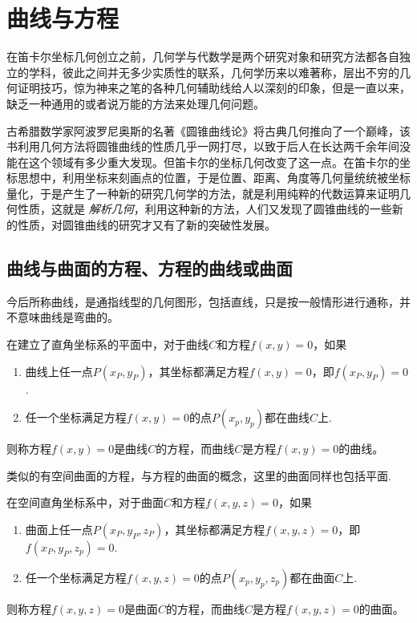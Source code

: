 
\section{曲线与方程}
\label{sec:curve-and-equation}

在笛卡尔坐标几何创立之前，几何学与代数学是两个研究对象和研究方法都各自独立的学科，彼此之间并无多少实质性的联系，几何学历来以难著称，层出不穷的几何证明技巧，惊为神来之笔的各种几何辅助线给人以深刻的印象，但是一直以来，缺乏一种通用的或者说万能的方法来处理几何问题。

古希腊数学家阿波罗尼奥斯的名著《圆锥曲线论》将古典几何推向了一个巅峰，该书利用几何方法将圆锥曲线的性质几乎一网打尽，以致于后人在长达两千余年间没能在这个领域有多少重大发现。但笛卡尔的坐标几何改变了这一点。在笛卡尔的坐标思想中，利用坐标来刻画点的位置，于是位置、距离、角度等几何量统统被坐标量化，于是产生了一种新的研究几何学的方法，就是利用纯粹的代数运算来证明几何性质，这就是 \emph{解析几何}，利用这种新的方法，人们又发现了圆锥曲线的一些新的性质，对圆锥曲线的研究才又有了新的突破性发展。

\subsection{曲线与曲面的方程、方程的曲线或曲面}
\label{sec:equation-of-curve-and-curve-of-equation}

今后所称曲线，是通指线型的几何图形，包括直线，只是按一般情形进行通称，并不意味曲线是弯曲的。

\begin{definition}
  在建立了直角坐标系的平面中，对于曲线$C$和方程$f(x,y)=0$，如果
  \begin{enumerate}
  \item 曲线上任一点$P(x_P,y_P)$，其坐标都满足方程$f(x,y)=0$，即$f(x_P,y_P)=0$.
  \item 任一个坐标满足方程$f(x,y)=0$的点$P(x_p,y_p)$都在曲线$C$上.
  \end{enumerate}
  则称方程$f(x,y)=0$是曲线$C$的方程，而曲线$C$是方程$f(x,y)=0$的曲线。
\end{definition}

类似的有空间曲面的方程，与方程的曲面的概念，这里的曲面同样也包括平面.

\begin{definition}
  在空间直角坐标系中，对于曲面$C$和方程$f(x,y,z)=0$，如果
  \begin{enumerate}
  \item 曲面上任一点$P(x_P,y_P,z_P)$，其坐标都满足方程$f(x,y,z)=0$，即$f(x_P,y_P,z_p)=0$.
  \item 任一个坐标满足方程$f(x,y,z)=0$的点$P(x_p,y_p,z_p)$都在曲面$C$上.
  \end{enumerate}
  则称方程$f(x,y,z)=0$是曲面$C$的方程，而曲线$C$是方程$f(x,y,z)=0$的曲面。
\end{definition}

